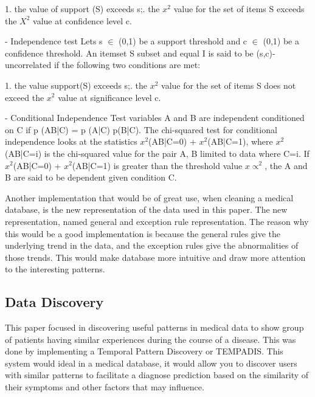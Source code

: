 \documentclass{sig-alternate}
\begin{document}
1. the value of support (S) exceeds s;. the $x^2$ value for the set of items S exceeds the $X^2$  value at confidence level c.\newline

- Independence test\newline
Lets s $\in$ (0,1) be a support threshold and c $\in$ (0,1) be a confidence threshold. An itemset S subset and equal I is said to be (s,c)-uncorrelated if the following two conditions are met:\newline

1. the value support(S) exceeds s;. the $x^2$ value for the set of items S does not exceed the $x^2$ value at significance level c.\newline

- Conditional Independence Test\newline
variables A and B are independent conditioned on C if p (AB|C) = p (A|C) p(B|C). The chi-squared test for conditional independence looks at the statistics $x^2$(AB|C=0) + $x^2$(AB|C=1), where $x^2$(AB|C=i) is the chi-squared value for the pair A, B limited to data where C=i. If $x^2$(AB|C=0) + $x^2$(AB|C=1) is greater than the threshold value $x\propto^2$, the A and B are said to be dependent given condition C.\newline

Another implementation that would be of great use, when cleaning a medical database, is the new representation of the data used in this paper.  The  new representation, named general and exception rule representation.  The reason why this would be a good implementation is because the general rules give the underlying trend in the data, and the exception rules give the abnormalities of those trends. This would make database more intuitive and draw more attention to the interesting patterns.\newline

	\subsection{Data Discovery}
	\label{Data Discovery}
	
	This paper focused in discovering useful patterns in medical data to show group of patients having similar experiences during the course of a disease. This was done by implementing a Temporal Pattern Discovery or TEMPADIS. This system would ideal in a medical database, it would allow you to discover users with similar patterns to facilitate a diagnose prediction based on the similarity of their symptoms and other factors that may influence.\newline 
\end{document}
